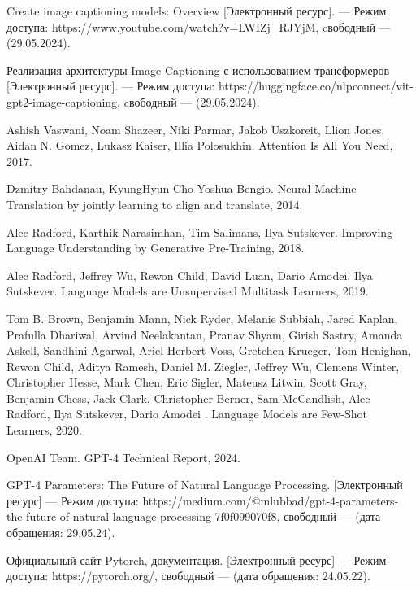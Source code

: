 \begin{thebibliography}{0}
	Create image captioning models: Overview [Электронный ресурс]. — Режим доступа: https://www.youtube.com/watch?v=LWIZj\_RJYjM, cвободный — (29.05.2024).
	
	Реализация архитектуры Image Captioning с использованием трансформеров [Электронный ресурс]. — Режим доступа: https://huggingface.co/nlpconnect/vit-gpt2-image-captioning, cвободный — (29.05.2024).
	
	Ashish Vaswani, Noam Shazeer, Niki Parmar, Jakob Uszkoreit, Llion Jones, Aidan N. Gomez, Lukasz Kaiser, Illia Polosukhin. Attention Is All You Need, 2017.
	
	Dzmitry Bahdanau, KyungHyun Cho Yoshua Bengio. Neural Machine Translation by jointly learning to align and translate, 2014.
	
	Alec Radford, Karthik Narasimhan, Tim Salimans, Ilya Sutskever. Improving Language Understanding by Generative Pre-Training, 2018.
	
	Alec Radford, Jeffrey Wu, Rewon Child, David Luan, Dario Amodei, Ilya Sutskever. Language Models are Unsupervised Multitask Learners, 2019.
	
	Tom B. Brown, Benjamin Mann, Nick Ryder, Melanie Subbiah, Jared Kaplan, Prafulla Dhariwal, Arvind Neelakantan, Pranav Shyam, Girish Sastry, Amanda Askell, Sandhini Agarwal, Ariel Herbert-Voss, Gretchen Krueger, Tom Henighan, Rewon Child, Aditya Ramesh, Daniel M. Ziegler, Jeffrey Wu, Clemens Winter, Christopher Hesse, Mark Chen, Eric Sigler, Mateusz Litwin, Scott Gray, Benjamin Chess, Jack Clark, Christopher Berner, Sam McCandlish, Alec Radford, Ilya Sutskever, Dario Amodei
. Language Models are Few-Shot Learners, 2020.
	
	OpenAI Team. GPT-4 Technical Report, 2024.
	
	 GPT-4 Parameters: The Future of Natural Language Processing. [Электронный ресурс] — Режим доступа: https://medium.com/@mlubbad/gpt-4-parameters-the-future-of-natural-language-processing-7f0f099070f8, свободный — (дата обращения: 29.05.24).
	
	
	 Официальный сайт Pytorch, документация. [Электронный ресурс] — Режим доступа: https://pytorch.org/, свободный — (дата обращения: 24.05.22).
	
\end{thebibliography}
